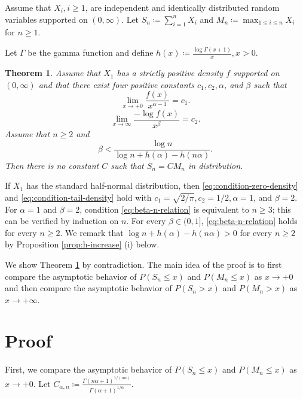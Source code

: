 \documentclass[a4paper, reqno, 11pt]{amsart}
\newtheorem{Thm}{Theorem}[section]
\theoremstyle{definition}
\begin{document}
Assume that $X_i, i \ge 1$, are independent and identically distributed random variables supported on $(0,\infty)$. 
Let $S_n \coloneqq \sum_{i=1}^{n} X_i$ and $M_n \coloneqq \max_{1 \le i \le n} X_i$ for $n \ge 1$. 

Let $\Gamma$ be the gamma function and define 
$h(x) \coloneqq \frac{\log \Gamma(x+1)}{x}, x > 0$. 

\begin{Thm}\label{thm:dis-AV}
Assume that $X_1$ has a strictly positive density $f$ supported on
$(0,\infty)$ and that there exist four positive constants $c_1, c_2, \alpha$, and $\beta$ such that 
\begin{equation}\label{eq:condition-zero-density} 
\lim_{x \to +0} \frac{f(x)}{x^{\alpha-1}} = c_1.  
\end{equation}  
\begin{equation}\label{eq:condition-tail-density}
\lim_{x \to \infty} \frac{-\log f(x)}{x^{\beta}} = c_2.  
\end{equation}  
Assume that $n \ge 2$ and 
\begin{equation}\label{eq:beta-n-relation}
\beta < \frac{\log n}{\log n + h(\alpha) - h(n\alpha)}. 
\end{equation}
Then there is no constant $C$ such that $S_n = CM_n$ in distribution. 
\end{Thm}

If $X_1$ has the standard half-normal distribution, 
then \eqref{eq:condition-zero-density} and \eqref{eq:condition-tail-density} hold with $c_1 = \sqrt{2/\pi}, c_2 = 1/2, \alpha = 1$, and $\beta = 2$. 
For $\alpha = 1$ and $\beta = 2$, 
condition \eqref{eq:beta-n-relation} is equivalent to $n \ge 3$; 
this can be verified by induction on $n$. 
For every $\beta \in (0,1]$, \eqref{eq:beta-n-relation} holds for every $n \ge 2$. 
We remark that $\log n + h(\alpha) - h(n\alpha) > 0$ for every $n \ge 2$ by Proposition \ref{prop:h-increase} (i) below. 

We show Theorem \ref{thm:dis-AV} by contradiction. 
The main idea of the proof is to first compare the asymptotic behavior of $P(S_n \le x)$ and $P(M_n \le x)$ as $x \to +0$ and then compare the asymptotic behavior of $P(S_n > x)$ and $P(M_n > x)$ as $x \to +\infty$. 

\section{Proof}

First, we compare the asymptotic behavior of $P(S_n \le x)$ and $P(M_n \le x)$ as $x \to +0$. 
Let $C_{\alpha, n} \coloneqq \frac{\Gamma(n\alpha+1)^{1/(n\alpha)}}{\Gamma(\alpha+1)^{1/\alpha}}$. 
\end{document}
